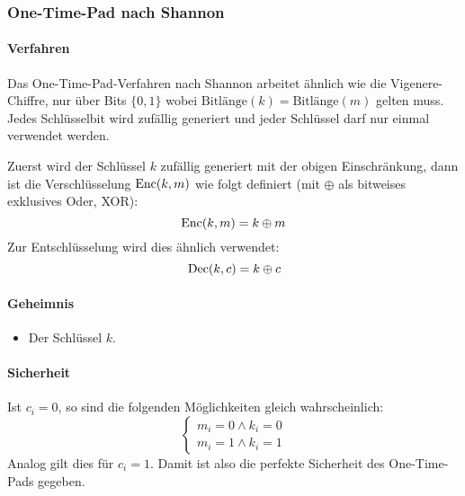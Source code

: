 			\subsubsection{One-Time-Pad nach Shannon}
				\paragraph{Verfahren}
					Das One-Time-Pad-Verfahren nach Shannon arbeitet ähnlich wie die Vigenere-Chiffre, nur über Bits \( \{ 0, 1 \} \) wobei \( \textrm{Bitlänge}(k) = \textrm{Bitlänge}(m) \) gelten muss. Jedes Schlüsselbit wird zufällig generiert und jeder Schlüssel darf nur einmal verwendet werden.

					Zuerst wird der Schlüssel \( k \) zufällig generiert mit der obigen Einschränkung, dann ist die Verschlüsselung \( \operatorname{Enc}(k, m) \) wie folgt definiert (mit \(\oplus\) als bitweises exklusives Oder, XOR):
					\begin{equation*}
						\operatorname{Enc}(k, m) = k \oplus m
					\end{equation*}
					Zur Entschlüsselung wird dies ähnlich verwendet:
					\begin{equation*}
						\operatorname{Dec}(k, c) = k \oplus c
					\end{equation*}

				\paragraph{Geheimnis}
					\begin{itemize}
						\item Der Schlüssel \(k\).
					\end{itemize}

				\paragraph{Sicherheit}
					Ist \( c_i = 0 \), so sind die folgenden Möglichkeiten gleich wahrscheinlich:
					\begin{equation*}
						\begin{cases*}
							m_i = 0 \land k_i = 0 \\
							m_i = 1 \land k_i = 1
						\end{cases*}
					\end{equation*}
					Analog gilt dies für \( c_i = 1 \). Damit ist also die perfekte Sicherheit des One-Time-Pads gegeben.

